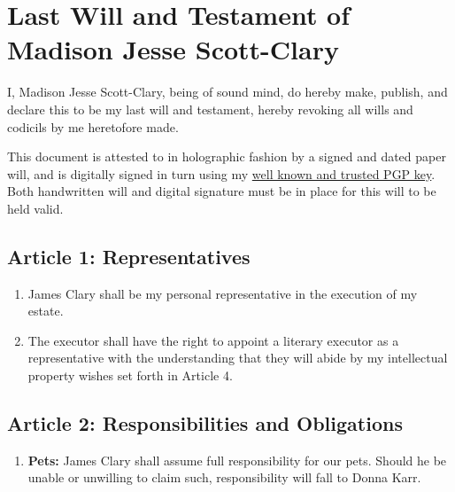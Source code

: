 \hypertarget{last-will-and-testament-of-madison-jesse-scott-clary}{%
\section*{Last Will and Testament of Madison Jesse Scott-Clary}\label{last-will-and-testament-of-madison-jesse-scott-clary}}

I, Madison Jesse Scott-Clary, being of sound mind, do hereby make, publish, and declare this to be my last will and testament, hereby revoking all wills and codicils by me heretofore made.

This document is attested to in holographic fashion by a signed and dated paper will, and is digitally signed in turn using my \href{http://pool.sks-keyservers.net/pks/lookup?search=0x33A1685050029F7D\&op=vindex}{well known and trusted PGP key}. Both handwritten will and digital signature must be in place for this will to be held valid.

\hypertarget{article-1-representatives}{%
\subsection*{Article 1: Representatives}\label{article-1-representatives}}

\begin{enumerate}
\def\labelenumi{\arabic{enumi}.}
\tightlist
\item
  James Clary shall be my personal representative in the execution of my estate.
\item
  The executor shall have the right to appoint a literary executor as a representative with the understanding that they will abide by my intellectual property wishes set forth in Article 4.
\end{enumerate}

\hypertarget{article-2-responsibilities-and-obligations}{%
\subsection*{Article 2: Responsibilities and Obligations}\label{article-2-responsibilities-and-obligations}}

\begin{enumerate}
\def\labelenumi{\arabic{enumi}.}
\tightlist
\item
  \textbf{Pets:} James Clary shall assume full responsibility for our pets. Should he be unable or unwilling to claim such, responsibility will fall to Donna Karr.
\end{enumerate}

